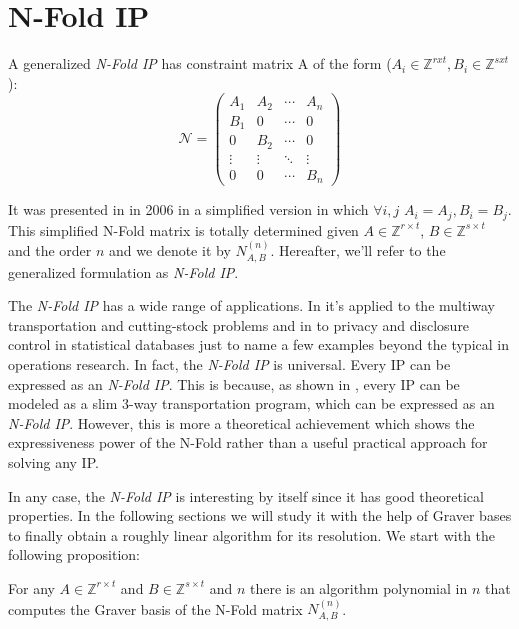 \chapter{N-Fold IP} \label{3.N-Fold}

A generalized \emph{N-Fold IP} has constraint matrix A of the form ($A_i \in \mathbb{Z}^{rxt}, B_i \in \mathbb{Z}^{sxt}$):\\
\begin{equation*} \label{NFold_matrix}
\mathcal{N} = 
\begin{pmatrix}
A_1 & A_2 & \cdots & A_n \\
B_1 & 0   & \cdots & 0 \\
0   & B_2 & \cdots & 0 \\
\vdots    & \vdots & \ddots & \vdots  \\
0   & 0   & \cdots & B_n 
\end{pmatrix}
\end{equation*}


It was presented in \cite{LHOW:2006} in 2006 in a simplified version in which $\forall i,j$  $A_i = A_j, B_i = B_j$. This simplified N-Fold matrix is totally determined given $A \in \mathbb{Z}^{r \times t}$, $B \in \mathbb{Z}^{s \times t}$ and the order $n$ and we denote it by $N_{A,B}^{(n)}$. Hereafter, we'll refer to the generalized formulation as \emph{N-Fold IP}. 

The \emph{N-Fold IP} has a wide range of applications. In \cite{LHOW:2006} it's applied to the multiway transportation and cutting-stock problems and in \cite{HEMMECKE:2011} to privacy and disclosure control in
statistical databases just to name a few examples beyond the typical in operations research. In fact, the \emph{N-Fold IP} is universal. Every IP can be expressed as an \emph{N-Fold IP}. This is because, as shown in \cite{LO:2006}, every IP can be modeled as a slim 3-way transportation program, which can be expressed as an \emph{N-Fold IP}. However, this is more a theoretical achievement which shows the expressiveness power of the N-Fold rather than a useful practical approach for solving any IP. 

In any case, the \emph{N-Fold IP} is interesting by itself since it has good theoretical properties. In the following sections we will study it with the help of Graver bases to finally obtain a roughly linear algorithm for its resolution. We start with the following proposition:

\begin{theorem} \label{Nfold_GB_computation_polynomial}
For any $A \in \mathbb{Z}^{r \times t}$ and $B \in \mathbb{Z}^{s \times t}$ and $n$ there is an algorithm polynomial in $n$ that computes the Graver basis of the N-Fold matrix $N_{A,B}^{(n)}$. 
\end{theorem}
\vspace{-10pt}

